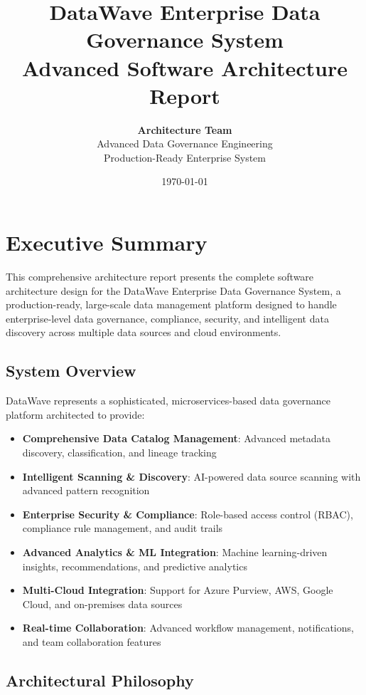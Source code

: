 \documentclass[12pt,a4paper]{article}
\title{\textbf{DataWave Enterprise Data Governance System\\
Advanced Software Architecture Report}}
\author{
\textbf{Architecture Team}\\
Advanced Data Governance Engineering\\
Production-Ready Enterprise System
}
\date{\today}
\begin{document}
\maketitle

\newpage

\tableofcontents

\newpage

\section{Executive Summary}

This comprehensive architecture report presents the complete software architecture design for the DataWave Enterprise Data Governance System, a production-ready, large-scale data management platform designed to handle enterprise-level data governance, compliance, security, and intelligent data discovery across multiple data sources and cloud environments.

\subsection{System Overview}

DataWave represents a sophisticated, microservices-based data governance platform architected to provide:

\begin{itemize}
    \item \textbf{Comprehensive Data Catalog Management}: Advanced metadata discovery, classification, and lineage tracking
    \item \textbf{Intelligent Scanning \& Discovery}: AI-powered data source scanning with advanced pattern recognition
    \item \textbf{Enterprise Security \& Compliance}: Role-based access control (RBAC), compliance rule management, and audit trails
    \item \textbf{Advanced Analytics \& ML Integration}: Machine learning-driven insights, recommendations, and predictive analytics
    \item \textbf{Multi-Cloud Integration}: Support for Azure Purview, AWS, Google Cloud, and on-premises data sources
    \item \textbf{Real-time Collaboration}: Advanced workflow management, notifications, and team collaboration features
\end{itemize}

\subsection{Architectural Philosophy}
\end{document}
